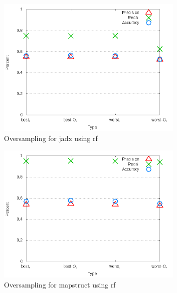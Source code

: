 \begin{figure}[!t]
\centering
\includegraphics[width=0.8\textwidth]{images/rf/test_4/jadx_sample_range.png}
\caption{Oversampling for jadx using \gls{rf}}
\label{fig:test_4_jadx_rf}
\end{figure}

\begin{figure}[!t]
\centering
\includegraphics[width=0.8\textwidth]{images/rf/test_4/mapstruct_sample_range.png}
\caption{Oversampling for mapstruct using \gls{rf}}
\label{fig:test_4_mapstruct_rf}
\end{figure}

